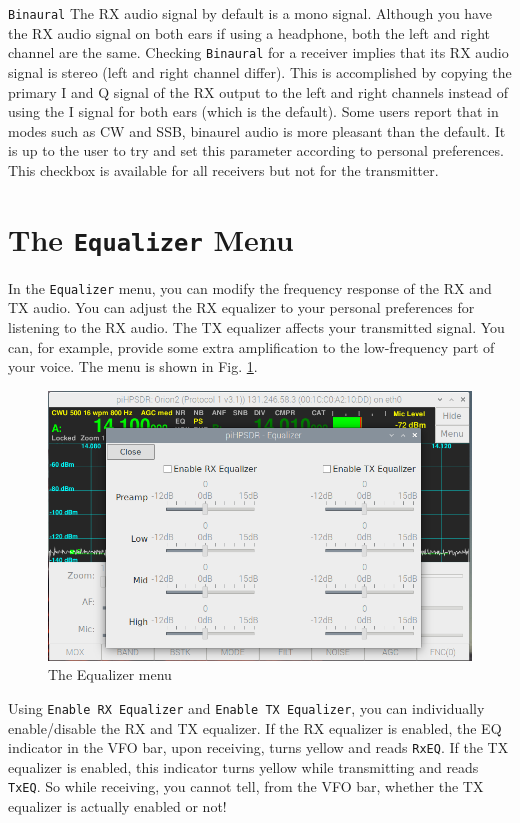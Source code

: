 \documentclass[12pt]{book}
\def\rett#1{\texttt{\color{red}#1}}
\def\bltt#1{\texttt{\color{blue}#1}}
\begin{document}
\rett{Binaural} The RX audio signal by default is a mono signal. Although
you have the RX audio signal on both ears if using a headphone, both the
left and right channel are the same. Checking \rett{Binaural} for a 
receiver implies that its RX audio signal is stereo (left and right channel
differ). This is accomplished by copying the primary I and Q signal of the
RX output to the left and right channels instead of using the I signal
for both ears (which is the default). Some users report that in modes
such as CW and SSB, binaurel audio is more pleasant than the default.
It is up to the user to try and set this parameter according to personal
preferences. This checkbox is available for all receivers but not for the
transmitter.

\section{The \texttt{Equalizer} Menu}

In the \bltt{Equalizer} menu, you can modify the frequency response of
the RX and TX audio. You can adjust the RX equalizer to your personal
preferences for listening to the RX audio. The TX equalizer affects
your transmitted signal. You can, for example, provide some extra
amplification to the low-frequency part of your voice. The menu
is shown in Fig. \ref{fig:EqualizerMenu}.

\begin{figure}[ht]
\center
\includegraphics[width=12cm]{EqualizerMenu.png}
\caption{The Equalizer menu}
\label{fig:EqualizerMenu}
\end{figure}

Using \rett{Enable RX Equalizer} and \rett{Enable TX Equalizer},
you can individually enable/disable the RX and TX equalizer.
If the RX equalizer is enabled, the EQ indicator in the
VFO bar, upon receiving, turns yellow and reads \rett{RxEQ}.
If the TX equalizer is enabled, this indicator turns yellow
while transmitting and reads \rett{TxEQ}. So while receiving,
you cannot tell, from the VFO bar, whether the TX equalizer is 
actually enabled or not!
\end{document}
